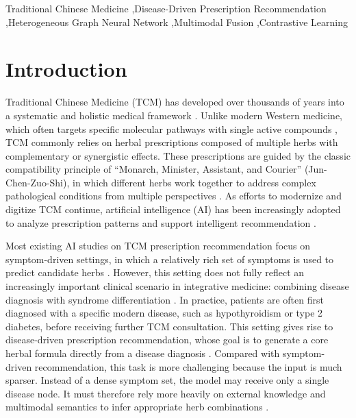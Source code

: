 \documentclass[a4paper,fleqn]{cas-dc}
\begin{document}

\begin{keywords}
 Traditional Chinese Medicine \sep Disease-Driven Prescription Recommendation \sep Heterogeneous Graph Neural Network \sep Multimodal Fusion \sep Contrastive Learning
\end{keywords}

\maketitle

\section{Introduction}\label{sec:intro}

Traditional Chinese Medicine (TCM) has developed over thousands of years into a systematic and holistic medical framework \cite{ref1,ref2,ref3}. Unlike modern Western medicine, which often targets specific molecular pathways with single active compounds \cite{ref4}, TCM commonly relies on herbal prescriptions composed of multiple herbs with complementary or synergistic effects. These prescriptions are guided by the classic compatibility principle of “Monarch, Minister, Assistant, and Courier” (Jun-Chen-Zuo-Shi), in which different herbs work together to address complex pathological conditions from multiple perspectives \cite{ref5,ref6,ref7}. As efforts to modernize and digitize TCM continue, artificial intelligence (AI) has been increasingly adopted to analyze prescription patterns and support intelligent recommendation \cite{ref8,ref9,ref10}.

Most existing AI studies on TCM prescription recommendation focus on symptom-driven settings, in which a relatively rich set of symptoms is used to predict candidate herbs \cite{ref11,ref12}. However, this setting does not fully reflect an increasingly important clinical scenario in integrative medicine: combining disease diagnosis with syndrome differentiation \cite{ref13,ref14,ref15}. In practice, patients are often first diagnosed with a specific modern disease, such as hypothyroidism or type 2 diabetes, before receiving further TCM consultation. This setting gives rise to disease-driven prescription recommendation, whose goal is to generate a core herbal formula directly from a disease diagnosis \cite{ref16,ref17}. Compared with symptom-driven recommendation, this task is more challenging because the input is much sparser. Instead of a dense symptom set, the model may receive only a single disease node. It must therefore rely more heavily on external knowledge and multimodal semantics to infer appropriate herb combinations \cite{ref18,ref19,ref20}.
\end{document}
